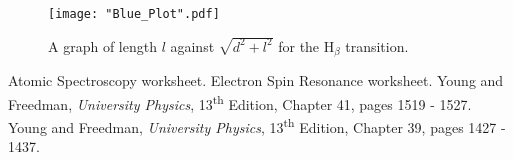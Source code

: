 \documentclass{article}
\newcommand{\figref}[2][\figurename~]{#1\ref{#2}}
\begin{document}
\begin{figure}[h]
\centering
\texttt{[image: "Blue\_Plot".pdf]}
\caption{A graph of length $l$ against $\sqrt{d^2+l^2}$ for the H$_\beta$ transition.}
\label{fig:Blue_Plot}
\end{figure}








\newpage
\begin{thebibliography}{9}
 Atomic Spectroscopy worksheet.
 Electron Spin Resonance worksheet. 
 Young and Freedman, \textit{University Physics}, 13\textsuperscript{th} Edition, Chapter 41, pages 1519 - 1527.
 Young and Freedman, \textit{University Physics}, 13\textsuperscript{th} Edition, Chapter 39, pages 1427 - 1437.
\end{thebibliography}
\end{document}
